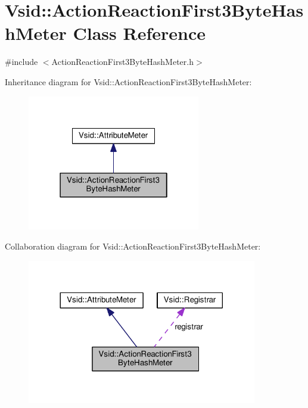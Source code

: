 \hypertarget{class_vsid_1_1_action_reaction_first3_byte_hash_meter}{\section{Vsid\-:\-:Action\-Reaction\-First3\-Byte\-Hash\-Meter Class Reference}
\label{class_vsid_1_1_action_reaction_first3_byte_hash_meter}
}


{\ttfamily \#include $<$Action\-Reaction\-First3\-Byte\-Hash\-Meter.\-h$>$}



Inheritance diagram for Vsid\-:\-:Action\-Reaction\-First3\-Byte\-Hash\-Meter\-:
\nopagebreak
\begin{figure}[H]
\begin{center}
\leavevmode
\includegraphics[width=214pt]{class_vsid_1_1_action_reaction_first3_byte_hash_meter__inherit__graph}
\end{center}
\end{figure}


Collaboration diagram for Vsid\-:\-:Action\-Reaction\-First3\-Byte\-Hash\-Meter\-:
\nopagebreak
\begin{figure}[H]
\begin{center}
\leavevmode
\includegraphics[width=284pt]{class_vsid_1_1_action_reaction_first3_byte_hash_meter__coll__graph}
\end{center}
\end{figure}
